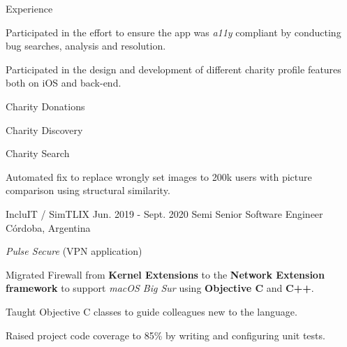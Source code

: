 \documentclass{curriculum}
\begin{document}
\begin{cvsection}{Experience}
\begin{sectionitemlist}
        \item{
            Participated in the effort to ensure the app was \textit{a11y} compliant
            by conducting bug searches, analysis and resolution.
        }

        \item{
            Participated in the design and development of
            different charity profile features both on iOS and back-end.
        }{
            \begin{colsectionitemlist}{3}
            \item{Charity Donations}
            \item{Charity Discovery}
            \item{Charity Search}
            \end{colsectionitemlist}
        }

        \item{
            Automated fix to replace wrongly set images to 200k users with
            picture comparison using structural similarity.
        }

        \end{sectionitemlist}


    \makesectionitemheader
        {IncluIT / SimTLIX}                             {Jun. 2019 - Sept. 2020}
        {Semi Senior Software Engineer}                                {Córdoba, Argentina}

        \begin{sectionitemlist}

        \item{\textit{Pulse Secure} (VPN application)}
            \begin{sectionitemlist}
            \item{
                Migrated Firewall from \textbf{Kernel Extensions} to the
                \textbf{Network Extension framework} to support \textit{macOS Big Sur}
                using \textbf{Objective C} and \textbf{C++}.
            }
            \item{
                Taught Objective C classes to guide colleagues new to the language.
            }
            \item{
                Raised project code coverage to 85\% by writing and configuring unit tests.
            }
            \end{sectionitemlist}


\end{sectionitemlist}
\end{cvsection}
\end{document}
